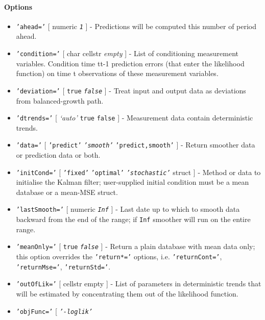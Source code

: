  \paragraph{Options}
 
 \begin{itemize}
 \item
   \texttt{'ahead='} {[} numeric \textbar{} \emph{\texttt{1}} {]} -
   Predictions will be computed this number of period ahead.
 \item
   \texttt{'condition='} {[} char \textbar{} cellstr \textbar{}
   \emph{empty} {]} - List of conditioning measurement variables.
   Condition time t\textbar{}t-1 prediction errors (that enter the
   likelihood function) on time t observations of these measurement
   variables.
 \item
   \texttt{'deviation='} {[} \texttt{true} \textbar{}
   \emph{\texttt{false}} {]} - Treat input and output data as deviations
   from balanced-growth path.
 \item
   \texttt{'dtrends='} {[} \emph{`auto'} \textbar{} \texttt{true}
   \textbar{} \texttt{false} {]} - Measurement data contain deterministic
   trends.
 \item
   \texttt{'data='} {[} \texttt{'predict'} \textbar{}
   \emph{\texttt{'smooth'}} \textbar{} \texttt{'predict,smooth'} {]} -
   Return smoother data or prediction data or both.
 \item
   \texttt{'initCond='} {[} \texttt{'fixed'} \textbar{}
   \texttt{'optimal'} \textbar{} \emph{\texttt{'stochastic'}} \textbar{}
   struct {]} - Method or data to initialise the Kalman filter;
   user-supplied initial condition must be a mean database or a mean-MSE
   struct.
 \item
   \texttt{'lastSmooth='} {[} numeric \textbar{} \emph{\texttt{Inf}} {]}
   - Last date up to which to smooth data backward from the end of the
   range; if \texttt{Inf} smoother will run on the entire range.
 \item
   \texttt{'meanOnly='} {[} \texttt{true} \textbar{}
   \emph{\texttt{false}} {]} - Return a plain database with mean data
   only; this option overrides the \texttt{'return*='} options, i.e.
   \texttt{'returnCont='}, \texttt{'returnMse='}, \texttt{'returnStd='}.
 \item
   \texttt{'outOfLik='} {[} cellstr \textbar{} empty {]} - List of
   parameters in deterministic trends that will be estimated by
   concentrating them out of the likelihood function.
 \item
   \texttt{'objFunc='} {[} \emph{\texttt{'-loglik'}} \textbar{}

\end{itemize}
